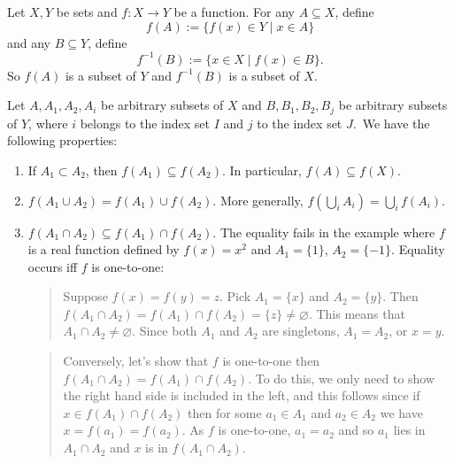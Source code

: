 \documentclass[12pt]{article}
\begin{document}
Let $X,Y$ be sets and $f:X\to Y$ be a function.  For any $A\subseteq X$, define $$f(A):=\lbrace f(x)\in Y \mid x\in A\rbrace$$ and any $B\subseteq Y$, define $$f^{-1}(B):=\lbrace x\in X\mid f(x)\in B\rbrace.$$
So $f(A)$ is a subset of $Y$ and $f^{-1}(B)$ is a subset of $X$.

Let $A,A_1,A_2,A_i$ be arbitrary subsets of $X$ and $B,B_1,B_2,B_j$ be arbitrary subsets of $Y$, where $i$ belongs to the index set $I$ and $j$ to the index set $J$.\, We have the following properties:

\begin{enumerate}
\item If $A_1\subset A_2$, then $f(A_1)\subseteq f(A_2)$.  In particular, $f(A)\subseteq f(X)$.
\item $f(A_1\cup A_2)=f(A_1)\cup f(A_2)$.  More generally, $f(\bigcup_i A_i)=\bigcup_i f(A_i)$.
\item \label{intersection_property} $f(A_1\cap A_2)\subseteq f(A_1)\cap f(A_2)$.  The equality fails in the example where $f$ is a real function defined by $f(x)=x^2$ and $A_1=\lbrace 1\rbrace$, $A_2=\lbrace -1\rbrace$.  Equality occurs iff $f$ is one-to-one: \begin{quote} Suppose $f(x)=f(y)=z$. Pick $A_1=\lbrace x\rbrace$ and $A_2=
\lbrace y\rbrace$.   Then $f(A_1\cap A_2) = f(A_1)\cap f(A_2)= \lbrace z\rbrace\ne\varnothing $.  This means that $A_1\cap A_2\ne \varnothing$.  Since both $A_1$ and $A_2$ are singletons, $A_1=A_2$, or $x=y$.  \end{quote}
\begin{quote} Conversely, let's show that $f$ is one-to-one then $f(A_1\cap A_2) = f(A_1)\cap f(A_2)$.  To do this, we only need to show the right hand side is included in the left, and this follows since if $x \in f(A_1)\cap f(A_2)$ then for some $a_1 \in A_1$ and $a_2 \in A_2$ we have $x = f(a_1) = f(a_2)$.  As $f$ is one-to-one, $a_1 = a_2$ and so $a_1$ lies in $A_1 \cap A_2$ and $x$ is in $f(A_1 \cap A_2)$. \end{quote}


\end{enumerate}
\end{document}
